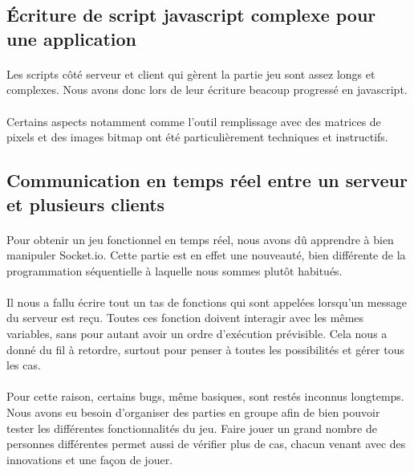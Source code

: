 \documentclass[11pt,a4paper]{article}
\begin{document}
        \subsection*{Écriture de script javascript complexe pour une application}
            \paragraph{}
            Les scripts côté serveur et client qui gèrent la partie jeu sont assez longs et complexes.
            Nous avons donc lors de leur écriture beacoup progressé en javascript.
            \paragraph{}
            Certains aspects notamment comme l'outil remplissage avec des matrices de pixels et des images bitmap 
            ont été particulièrement techniques et instructifs.
        \subsection*{Communication en temps réel entre un serveur et plusieurs clients}
            \paragraph{}
            Pour obtenir un jeu fonctionnel en temps réel, nous avons dû apprendre à bien manipuler Socket.io.
            Cette partie est en effet une nouveauté,
            bien différente de la programmation séquentielle à laquelle nous sommes plutôt habitués.
            \paragraph{}
            Il nous a fallu écrire tout un tas de fonctions qui sont appelées lorsqu'un message du serveur est reçu.
            Toutes ces fonction doivent interagir avec les mêmes variables, sans pour autant avoir un ordre d'exécution prévisible.
            Cela nous a donné du fil à retordre, surtout pour penser à toutes les possibilités et gérer tous les cas.
            \paragraph{}
            Pour cette raison, certains bugs, même basiques, sont restés inconnus longtemps.
            Nous avons eu besoin d'organiser des parties en groupe afin de bien pouvoir tester les différentes fonctionnalités du jeu.
            Faire jouer un grand nombre de personnes différentes permet aussi de vérifier plus de cas,
            chacun venant avec des innovations et une façon de jouer.
\end{document}
